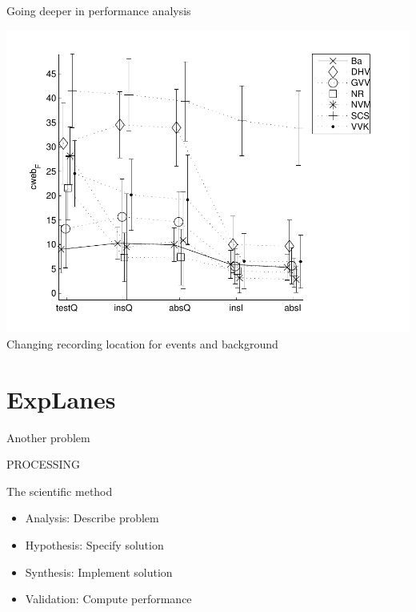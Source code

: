 \documentclass[compress]{beamer}
\begin{document}
\begin{frame}{Going deeper in performance analysis}
\begin{center}
\includegraphics[width=.8\columnwidth]{../figures/irccyn} \\
Changing recording location for events and background
\end{center}
\end{frame}


\section{ExpLanes}

\begin{frame}{Another problem}
\begin{center}
\huge PROCESSING
\end{center}
\end{frame}

\begin{frame}{The scientific method}
\begin{itemize}
\item Analysis: Describe problem 
\item Hypothesis: Specify solution 
\item Synthesis: Implement solution 
\item Validation: Compute performance 
\end{itemize}
\end{frame}
\end{document}
